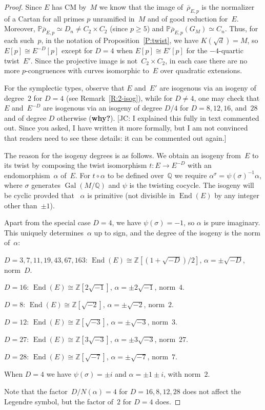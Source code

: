 \documentclass[12pt, reqno]{amsart}
\newcommand{\PP}{\mathbb{P}}
\newcommand{\Q}{\mathbb{Q}}
\newcommand{\Z}{\mathbb{Z}}
\newcommand{\rhobar}{{\overline{\rho}}}
\DeclareMathOperator{\End}{End}
\DeclareMathOperator{\Gal}{Gal}
\numberwithin{equation}{section}
\theoremstyle{definition}
\theoremstyle{remark}
\newcommand{\jc}[1]{{\color{darkgreen} \textsf{[JC: #1]}}}
\begin{document}
\begin{proof}
Since $E$ has CM by~$M$ we know that the image of~$\rhobar_{E,p}$ is
the normalizer of a Cartan for all primes $p$ unramified in~$M$ and of
good reduction for~$E$.  Moreover, $\PP \rhobar_{E,p} \simeq D_n \neq
C_2 \times C_2$ (since $p \geq 5$) and $\PP \rhobar_{E,p}(G_M) \simeq
C_n$. Thus, for each such~$p$, in the notation of
Proposition~\ref{P:twist}, we have $K(\sqrt{d})=M$, so $E[p]\cong
E^{-D}[p]$ except for $D=4$ when $E[p]\cong E'[p]$ for the
$-4$-quartic twist~$E'$.  Since the projective image is not~$C_2\times
C_2$, in each case there are no more $p$-congruences with curves
isomorphic to~$E$ over quadratic extensions.

For the symplectic types, observe that $E$ and~$E'$ are isogenous via
an isogeny of degree~$2$ for $D=4$ (see Remark~\ref{R:2-isog}), while
for $D\not=4$, one may check that $E$ and~$E^{-D}$ are isogenous via
an isogeny of degree $D/4$ for $D=8,12,16$, and~$28$ and of degree $D$
otherwise ({\bf why?}).  \jc{I explained this fully in text commented
  out.  Since you asked, I have written it more formally, but I am not
  convinced that readers need to see these details: it can be
  commented out again.}

The reason for the isogeny degrees is as follows.  We obtain an
isogeny from~$E$ to its twist by composing the twist isomorphism
$t:E\to E^{-D}$ with an endomorphism~$\alpha$ of~$E$.  For
$t\circ\alpha$ to be defined over~$\Q$ we require
$\alpha^{\sigma}=\psi(\sigma)^{-1}\alpha$, where $\sigma$ generates
$\Gal(M/\Q)$ and $\psi$ is the twisting cocycle.  The isogeny will be
cyclic provded that ~$\alpha$ is primitive (not divisible in $\End(E)$
by any integer other than~$\pm1$).

Apart from the special case $D=4$, we have $\psi(\sigma)=-1$, so
$\alpha$ is pure imaginary.  This uniquely determines~$\alpha$ up to
sign, and the degree of the isogeny is the norm of~$\alpha$:

$D = 3, 7, 11, 19, 43, 67, 163$: $\End(E)\cong\Z[(1+\sqrt{-D})/2]$,
$\alpha=\pm\sqrt{-D}$, norm~$D$.

$D = 16$: $\End(E)\cong\Z[2\sqrt{-1}]$, $\alpha=\pm2\sqrt{-1}$, norm~$4$.

$D = 8$: $\End(E)\cong\Z[\sqrt{-2}]$, $\alpha=\pm\sqrt{-2}$, norm~$2$.

$D = 12$: $\End(E)\cong\Z[\sqrt{-3}]$, $\alpha=\pm\sqrt{-3}$, norm~$3$.

$D = 27$: $\End(E)\cong\Z[3\sqrt{-3}]$, $\alpha=\pm3\sqrt{-3}$, norm~$27$.

$D = 28$: $\End(E)\cong\Z[\sqrt{-7}]$, $\alpha=\pm\sqrt{-7}$, norm~$7$.


When $D=4$ we have $\psi(\sigma)=\pm i$ and $\alpha=\pm1\pm i$, with
norm~$2$.


Note that the factor~$D/N(\alpha)=4$ for $D=16,8,12,28$ does not
affect the Legendre symbol, but the factor of~$2$ for $D=4$ does.
\end{proof}
\end{document}
